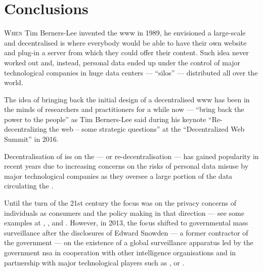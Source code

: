 \documentclass[showtrims, oldfontcommands]{kthesis}
\begin{document}
\renewcommand\thesection{\thechapter.\arabic{section}}
\chapter{Conclusions}
    \label{chapter:conclusions}

\lettrine{\textcolor[gray]{.25}{W}}{hen} Tim Berners-Lee invented the \Ac{www} in 
1989, he envisioned a large-scale and decentralised \ac{is} where everybody would 
be able to have their own website and plug-in a server from which they could offer 
their content. Such idea never worked out and, instead, personal data ended up under 
the control of major technological companies in huge data centers --- ``silos'' 
--- distributed all over the world.

The idea of bringing back the initial design of a decentralised \ac{www} has been 
in the minds of researchers and practitioners for a while now --- ``bring back the 
power to the people'' as Tim Berners-Lee said during his keynote ``Re-decentralizing 
the web -- some strategic questions'' at the ``Decentralized Web Summit'' in 2016. 

Decentralisation of \acp{is} on the \Internet --- or re-decentralisation --- has 
gained popularity in recent years due to increasing concerns on the risks of personal 
data misuse by major technological companies as they oversee a large portion of 
the data circulating the \Internet.

Until the turn of the 21st century the focus was on the privacy concerns of individuals 
as consumers and the policy making in that direction --- see some examples at \cite{MilbergBSK95}, 
\cite{Rindfleisch97}, \cite{Clarke99} and \cite{NamSPI06}. However, in 2013, the 
focus shifted to governmental mass surveillance after the disclosures of Edward 
Snowden --- a former contractor of the  government --- on the existence 
of a global surveillance apparatus led by the  government \Ac{nsa} in cooperation 
with other intelligence organisations and in partnership with major technological 
players such as \Google, \Facebook or \Apple. 
\end{document}
